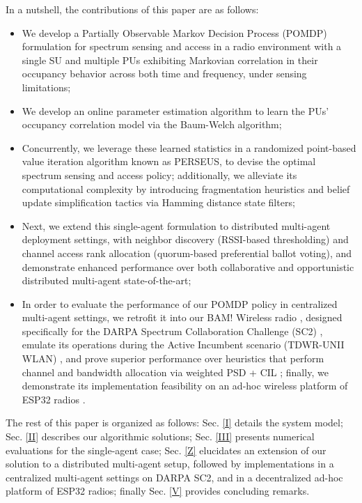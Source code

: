 \documentclass[12pt, draftcls, onecolumn]{IEEEtran}
\begin{document}
 In a nutshell, the contributions of this paper are as follows:
\begin{itemize}
    \item We develop a 
     Partially Observable Markov Decision Process (POMDP) formulation for spectrum sensing and access in a radio environment with a single SU and multiple PUs exhibiting Markovian correlation in their occupancy behavior across both time and frequency, under sensing limitations;
    \item We develop an online parameter estimation algorithm to learn the PUs' occupancy correlation model via  the Baum-Welch algorithm;
    \item Concurrently, we leverage these learned statistics in a randomized point-based value iteration algorithm known as PERSEUS, to devise the optimal spectrum sensing and access policy; additionally, we alleviate its computational complexity by introducing fragmentation heuristics and belief update simplification tactics via Hamming distance state filters;
    \item Next, we extend this single-agent formulation to distributed multi-agent deployment settings, with neighbor discovery (RSSI-based thresholding) and channel access rank allocation (quorum-based preferential ballot voting), and demonstrate enhanced performance over both collaborative and opportunistic distributed multi-agent state-of-the-art;
    \item In order to evaluate the performance of our POMDP policy in centralized multi-agent settings, we retrofit it into our BAM! Wireless radio \cite{BAM}, designed specifically for the DARPA Spectrum Collaboration Challenge (SC2) \cite{DARPA:SC2, DARPA:SC2scenarios}, emulate its operations during the Active Incumbent scenario (TDWR-UNII WLAN) \cite{DARPA:ActiveIncumbent}, and prove superior performance over heuristics that perform channel and bandwidth allocation via weighted PSD + CIL  \cite{DARPA:CIL, DARPASC2:end1, 8935729, DARPASC2:end3, DARPASC2:end4}; 
    finally, we demonstrate its implementation feasibility on an ad-hoc wireless platform of ESP32 radios \cite{GCTronic:epuck2, Espressif:ESP32}.
\end{itemize}

The rest of this paper is organized as follows: Sec. \ref{I} details the system model; Sec. \ref{II} describes
our algorithmic solutions; Sec. \ref{III} presents numerical evaluations for the single-agent case; Sec. \ref{Z} elucidates an extension of our solution to a distributed multi-agent setup,
followed by implementations in a centralized multi-agent settings on DARPA SC2,
and in a decentralized ad-hoc platform of ESP32 radios;  finally Sec. \ref{V} provides concluding remarks.
\end{document}
